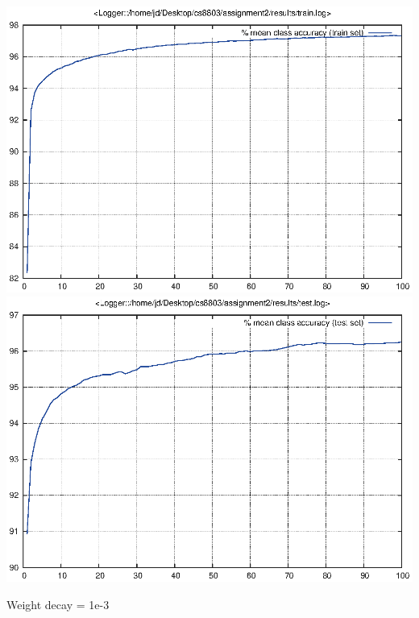 \documentclass[twoside,12pt]{article}
\newcommand{\imsize}{0.5\linewidth}
\begin{document}
\includegraphics[width=\imsize]{assignment2/results/sgdw_train}
\includegraphics[width=\imsize]{assignment2/results/sgdw_test}

Weight decay = 1e-3
\end{document}
